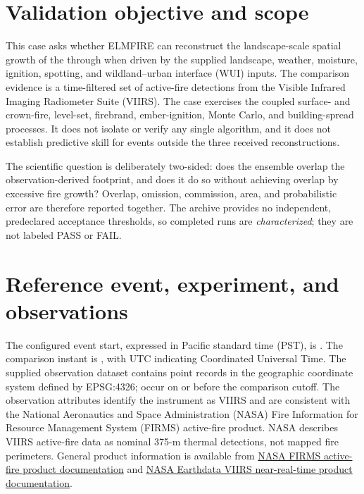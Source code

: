 \section{Validation objective and scope}

This case asks whether ELMFIRE can reconstruct the landscape-scale spatial
growth of the \CaseTitle{} through \SimulationDuration{} when driven by the
supplied landscape, weather, moisture, ignition, spotting, and wildland--urban
interface (WUI) inputs.  The comparison evidence is a time-filtered set of active-fire detections from the
Visible Infrared Imaging Radiometer Suite (VIIRS).
The case exercises the coupled surface- and crown-fire, level-set, firebrand,
ember-ignition, Monte Carlo, and building-spread processes.  It does not isolate
or verify any single algorithm, and it does not establish predictive skill for
events outside the three received reconstructions.

The scientific question is deliberately two-sided: does the ensemble overlap
the observation-derived footprint, and does it do so without achieving overlap
by excessive fire growth?  Overlap, omission, commission, area, and
probabilistic error are therefore reported together.  The archive provides no
independent, predeclared acceptance thresholds, so completed runs are
\emph{characterized}; they are not labeled PASS or FAIL.

\section{Reference event, experiment, and observations}

The configured event start, expressed in Pacific standard time (PST), is
\EventStart{}. The comparison instant is \ComparisonTime{}, with UTC
indicating Coordinated Universal Time.  The supplied observation dataset contains
 point records in the
geographic coordinate system defined by EPSG:4326;  occur
on or before the comparison cutoff.  The observation attributes identify the instrument
as VIIRS and are consistent
with the National Aeronautics and Space Administration (NASA) Fire Information
for Resource Management System (FIRMS) active-fire product.  NASA describes VIIRS
active-fire data as nominal 375-m thermal detections, not mapped fire
perimeters.  General product information is available from
\href{https://firms.modaps.eosdis.nasa.gov/active_fire/}{NASA FIRMS active-fire product documentation} and
\href{https://www.earthdata.nasa.gov/data/catalog/lancemodis-vnp14img-nrt-2}{NASA Earthdata VIIRS near-real-time product documentation}.

